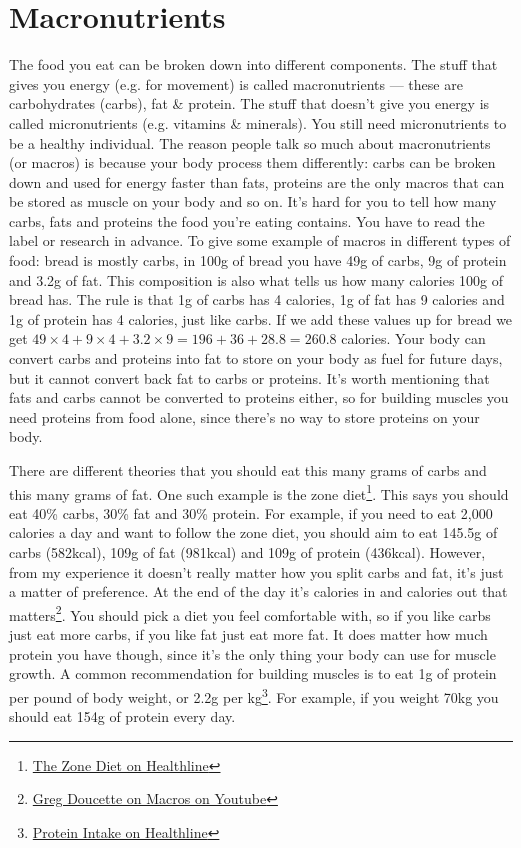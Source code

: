 \documentclass[openany, 12pt]{book}
\begin{document}
	\section{Macronutrients}
	
	The food you eat can be broken down into different components. The stuff that gives you energy (e.g. for movement) is called macronutrients --- these are carbohydrates
	(carbs), fat \& protein. The stuff that doesn't give you energy is called micronutrients (e.g. vitamins \& minerals). You still need micronutrients to be a healthy individual.
	The reason people talk so much about macronutrients (or macros) is because your body process them differently: carbs can be broken down and used for energy faster than fats,
	proteins are the only macros that can be stored as muscle on your body and so on. It's hard for you to tell how many carbs, fats and proteins the food you're eating contains.
	You have to read the label or research in advance. To give some example of macros in different types of food: bread is mostly carbs, in 100g of bread you have 49g of carbs,
	9g of protein and 3.2g of fat. This composition is also what tells us how many calories 100g of bread has. The rule is that 1g of carbs has 4 calories, 1g of fat has 9 calories
	and 1g of protein has 4 calories, just like carbs. If we add these values up for bread we get $49 \times 4 + 9 \times 4 + 3.2 \times 9 = 196 + 36 + 28.8 = 260.8$ calories. Your
	body can convert carbs and proteins into fat to store on your body as fuel for future days, but it cannot convert back fat to carbs or proteins. It's worth mentioning that
	fats and carbs cannot be converted to proteins either, so for building muscles you need proteins from food alone, since there's no way to store proteins on your body. 
	
	There are different theories that you should eat this many grams of carbs and this many grams of fat. One such example is the zone 
	diet\footnote{\href{https://www.healthline.com/nutrition/zone-diet}{The Zone Diet on Healthline}}. This says you should eat 40\% carbs, 30\% fat and 30\% protein. For example,
	if you need to eat 2,000 calories a day and want to follow the zone diet, you should aim to eat 145.5g of carbs (582kcal), 109g of fat (981kcal) and 109g of protein (436kcal).
	However, from my experience it doesn't really matter how you split carbs and fat, it's just a matter of preference. At the end of the day it's calories in and calories out that
	matters\footnote{\href{https://www.youtube.com/watch?v=ssmJ50HRTp8}{Greg Doucette on Macros on Youtube}}. You should pick a diet you feel comfortable with, so if you like carbs just eat more carbs, if you like fat just eat more fat.
	It does matter how much protein you have though, since it's the only thing your body can use for muscle growth. A common recommendation for building muscles is to eat
	1g of protein per pound of body weight, or 2.2g per kg\footnote{\href{https://www.healthline.com/nutrition/how-much-protein-per-day}{Protein Intake on Healthline}}. For example,
	if you weight 70kg you should eat 154g of protein every day.
	
\end{document}
